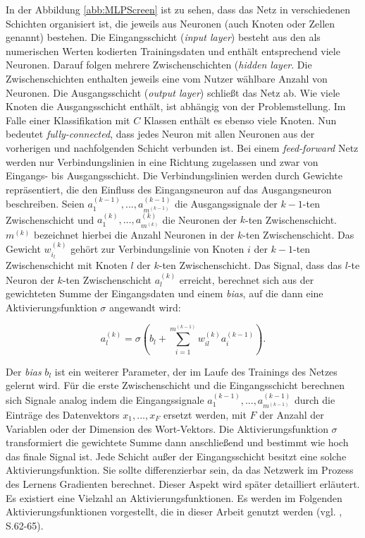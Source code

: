 \documentclass[a4paper,11pt]{article}
\begin{document}
In der Abbildung \ref{abb:MLPScreen} ist zu sehen, dass das Netz in verschiedenen Schichten organisiert ist, die jeweils aus Neuronen (auch Knoten oder Zellen genannt) bestehen. Die Eingangsschicht (\textit{input layer}) besteht aus den als numerischen Werten kodierten Trainingsdaten und enthält entsprechend viele Neuronen. Darauf folgen mehrere Zwischenschichten (\textit{hidden layer}. Die Zwischenschichten enthalten jeweils eine vom Nutzer wählbare Anzahl von Neuronen. Die Ausgangsschicht (\textit{output layer}) schließt das Netz ab. Wie viele Knoten die Ausgangsschicht enthält, ist abhängig von der Problemstellung. Im Falle einer Klassifikation mit $C$ Klassen enthält es ebenso viele Knoten. Nun bedeutet \textit{fully-connected}, dass jedes Neuron mit allen Neuronen aus der vorherigen und nachfolgenden Schicht verbunden ist. Bei einem \textit{feed-forward} Netz werden nur Verbindungslinien in eine Richtung zugelassen und zwar von Eingangs- bis Ausgangsschicht. Die Verbindungslinien werden durch Gewichte repräsentiert, die den Einfluss des Eingangsneuron auf das Ausgangsneuron beschreiben. Seien $a_1^{(k-1)},..., a_{m^{(k-1)}}^{(k-1)}$ die Ausgangssignale der $k-1$-ten Zwischenschicht und $a_{1}^{(k)},..., a_{m^{(k)}}^{(k)}$ die Neuronen der $k$-ten Zwischenschicht. $m^{(k)}$ bezeichnet hierbei die Anzahl Neuronen in der $k$-ten Zwischenschicht. 
Das Gewicht $w_{i_l}^{(k)}$ gehört zur Verbindungslinie von Knoten $i$ der $k-1$-ten Zwischenschicht mit Knoten $l$ der $k$-ten Zwischenschicht. Das Signal, dass das $l$-te Neuron der $k$-ten Zwischenschicht $a_{l}^{(k)}$ erreicht, berechnet sich aus der gewichteten Summe der Eingangsdaten und einem \textit{bias}, auf die dann eine Aktivierungsfunktion $\sigma$ angewandt wird:

\[ a_{l}^{(k)} = \sigma (b_l + \sum_{i=1}^{m^{(k-1)}} w_{il}^{(k)} a_{i}^{(k-1)}).\]

Der \textit{bias} $b_l$ ist ein weiterer Parameter, der im Laufe des Trainings des Netzes gelernt wird.
Für die erste Zwischenschicht und die Eingangsschicht berechnen sich Signale analog indem die Eingangssignale $a_{1}^{(k-1)},..., a_{m^{(k-1)}}^{(k-1)}$ durch die Einträge des Datenvektors $x_1, ..., x_F$ ersetzt werden, mit $F$ der Anzahl der Variablen oder der Dimension des Wort-Vektors. Die Aktivierungsfunktion $\sigma$ transformiert die gewichtete Summe dann anschließend und bestimmt wie hoch das finale Signal ist. Jede Schicht außer der Eingangsschicht besitzt eine solche Aktivierungsfunktion. Sie sollte differenzierbar sein, da das Netzwerk im Prozess des Lernens Gradienten berechnet. Dieser Aspekt wird später detailliert erläutert. Es existiert eine Vielzahl an Aktivierungsfunktionen. Es werden im Folgenden Aktivierungsfunktionen vorgestellt, die in dieser Arbeit genutzt werden (vgl. \cite{deepEssentials}, S.62-65). 
\end{document}
